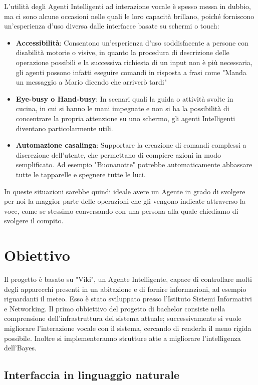 \documentclass[twoside]{supsistudent}
\begin{document}
L'utilità degli Agenti Intelligenti ad interazione vocale è spesso messa in dubbio, ma ci sono alcune occasioni nelle quali le loro capacità brillano, poiché forniscono un'esperienza d'uso diversa dalle interfacce basate su schermi o touch:
\begin{itemize}
	\item \textbf{Accessibilità}: Consentono un'esperienza d'uso soddisfacente a persone con disabilità motorie o visive, in quanto la procedura di descrizione delle operazione possibili e la successiva richiesta di un input non è più necessaria, gli agenti possono infatti eseguire comandi in risposta a frasi come "Manda un messaggio a Mario dicendo che arriverò tardi"
	\item \textbf{Eye-busy o Hand-busy}: In scenari quali la guida o attività svolte in cucina, in cui si hanno le mani impegnate e non si ha la possibilità di concentrare la propria attenzione su uno schermo, gli agenti Intelligenti diventano particolarmente utili.
	\item \textbf{Automazione casalinga}: Supportare la creazione di comandi complessi a discrezione dell'utente, che permettano di compiere azioni in modo semplificato. Ad esempio "Buonanotte" potrebbe automaticamente abbassare tutte le tapparelle e spegnere tutte le luci.
\end{itemize}
In queste situazioni sarebbe quindi ideale avere un Agente in grado di svolgere per noi la maggior parte delle operazioni che gli vengono indicate attraverso la voce, come se stessimo conversando con una persona alla quale chiediamo di svolgere il compito.

\chapter{Obiettivo}

Il progetto è basato su "Viki", un Agente Intelligente, capace di controllare molti degli apparecchi presenti in un abitazione e di fornire informazioni, ad esempio riguardanti il meteo.\cite{agenteinteligente}
Esso è stato sviluppato presso l'Istituto Sistemi Informativi e Networking. \cite{ISIN}
Il primo obbiettivo del progetto di bachelor consiste nella comprensione dell'infrastruttura del sistema attuale; successivamente si  vuole migliorare l'interazione vocale con il sistema, cercando di renderla il meno rigida possibile. Inoltre si implementeranno strutture atte a migliorare l'intelligenza dell'Bayes.

\section{Interfaccia in linguaggio naturale}
\end{document}
